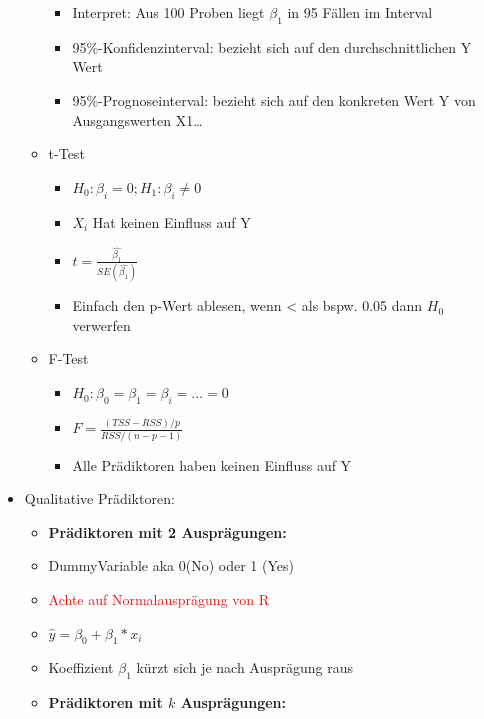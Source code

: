 \documentclass[a4paper]{article}
\begin{document}
\begin{landscape}
\begin{multicols}{3}
\begin{itemize}[noitemsep,nolistsep,leftmargin=*]
\begin{itemize}[noitemsep,nolistsep,leftmargin=*]
\begin{itemize}[noitemsep,nolistsep,leftmargin=*]
                    \item Interpret: Aus 100 Proben liegt $ \beta_1$ in 95 Fällen im Interval
                    \item 95\%-Konfidenzinterval: bezieht sich auf den durchschnittlichen Y Wert
                    \item 95\%-Prognoseinterval: bezieht sich auf den konkreten Wert Y von Ausgangswerten X1\dots
                \end{itemize}
                \item t-Test
                \begin{itemize}[noitemsep,nolistsep,leftmargin=*]
                    \item $H_0: \beta_i = 0; H_1: \beta_i \neq 0$
                    \item $X_i$ Hat keinen Einfluss auf Y
                    \item $t = \frac{\hat{\beta_1}}{SE(\hat{\beta_1})}$
                    \item Einfach den p-Wert ablesen, wenn < als bspw. 0.05 dann $H_0$ verwerfen
                \end{itemize}
                \item F-Test
                \begin{itemize}[noitemsep,nolistsep,leftmargin=*]
                    \item $H_0: \beta_0 = \beta_1 = \beta_i= ... = 0$
                    \item $F =\frac{(TSS-RSS)/p}{RSS/(n-p-1)}$
                    \item Alle Prädiktoren haben keinen Einfluss auf Y
                \end{itemize}
            \end{itemize}
            \item Qualitative Prädiktoren:
            \begin{itemize}[noitemsep,nolistsep,leftmargin=*]
                \item \textbf{Prädiktoren mit 2 Ausprägungen:}
                \item DummyVariable aka 0(No) oder 1 (Yes)
                \item \textcolor{red}{Achte auf Normalausprägung von R}
                \item $\hat{y} = \beta_0 + \beta_1*x_i $
                \item Koeffizient $\beta_1$ kürzt sich je nach Ausprägung raus
                \item \textbf{Prädiktoren mit $k$ Ausprägungen:}

\end{itemize}
\end{itemize}
\end{multicols}
\end{landscape}
\end{document}

